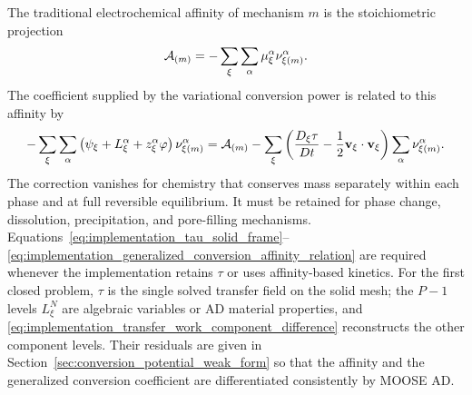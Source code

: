 The traditional electrochemical affinity of mechanism \(m\) is the
stoichiometric projection
\begin{equation}
	\mathcal{A}_{(m)}
	=
	-\sum_\xi\sum_\alpha
	\mu_\xi^\alpha
	\nu_{\xi (m)}^\alpha .
	\label{eq:implementation_affinity_projection}
\end{equation}
The coefficient supplied by the variational conversion power is related to
this affinity by
\begin{equation}
	-\sum_\xi\sum_\alpha
	\left(
	\psi_\xi+L_\xi^\alpha+z_\xi^\alpha\varphi
	\right)
	\nu_{\xi (m)}^\alpha
	=
	\mathcal{A}_{(m)}
	-
	\sum_\xi
	\left(
	\frac{D_\xi\tau}{Dt}
	-\frac{1}{2}\mathbf{v}_\xi\cdot\mathbf{v}_\xi
	\right)
	\sum_\alpha\nu_{\xi (m)}^\alpha .
	\label{eq:implementation_generalized_conversion_affinity_relation}
\end{equation}
The correction vanishes for chemistry that conserves mass separately within
each phase and at full reversible equilibrium.  It must be retained for phase
change, dissolution, precipitation, and pore-filling mechanisms.
Equations~\eqref{eq:implementation_tau_solid_frame}--
\eqref{eq:implementation_generalized_conversion_affinity_relation} are required whenever the
implementation retains \(\tau\) or uses affinity-based kinetics.  For the first
closed problem, \(\tau\) is the single solved transfer field on the solid mesh;
the \(P-1\) levels \(L_\xi^N\) are algebraic variables or AD material
properties, and \eqref{eq:implementation_transfer_work_component_difference}
reconstructs the other component levels.  Their residuals are given in
Section~\ref{sec:conversion_potential_weak_form} so that the affinity and
the generalized conversion coefficient are differentiated consistently by
MOOSE AD.
